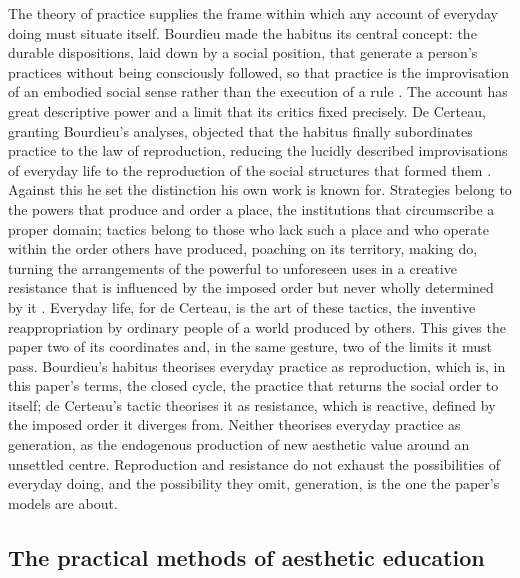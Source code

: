 The theory of practice supplies the frame within which any account of everyday doing must situate itself. Bourdieu made the habitus its central concept: the durable dispositions, laid down by a social position, that generate a person's practices without being consciously followed, so that practice is the improvisation of an embodied social sense rather than the execution of a rule \parencite{bourdieu1990}. The account has great descriptive power and a limit that its critics fixed precisely. De Certeau, granting Bourdieu's analyses, objected that the habitus finally subordinates practice to the law of reproduction, reducing the lucidly described improvisations of everyday life to the reproduction of the social structures that formed them \parencite{decerteau1984}. Against this he set the distinction his own work is known for. Strategies belong to the powers that produce and order a place, the institutions that circumscribe a proper domain; tactics belong to those who lack such a place and who operate within the order others have produced, poaching on its territory, making do, turning the arrangements of the powerful to unforeseen uses in a creative resistance that is influenced by the imposed order but never wholly determined by it \parencite{decerteau1984}. Everyday life, for de Certeau, is the art of these tactics, the inventive reappropriation by ordinary people of a world produced by others. This gives the paper two of its coordinates and, in the same gesture, two of the limits it must pass. Bourdieu's habitus theorises everyday practice as reproduction, which is, in this paper's terms, the closed cycle, the practice that returns the social order to itself; de Certeau's tactic theorises it as resistance, which is reactive, defined by the imposed order it diverges from. Neither theorises everyday practice as generation, as the endogenous production of new aesthetic value around an unsettled centre. Reproduction and resistance do not exhaust the possibilities of everyday doing, and the possibility they omit, generation, is the one the paper's models are about.

\subsection{The practical methods of aesthetic education}
\label{p23:sub:field-edupractice}

